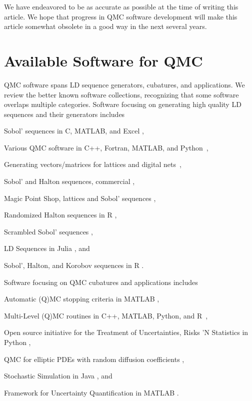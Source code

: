 \documentclass[graybox,footinfo]{svmult}
\begin{document}
We have endeavored to be as accurate as possible at the time of writing this article.  We hope that progress in QMC software development will make this article somewhat obsolete in a good way in the next several years.

\section{Available Software for QMC} \label{sec:available} 
QMC software spans  LD sequence generators, cubatures, and applications.  We review the better known software collections, recognizing that some software overlaps multiple categories.
Software focusing on generating high quality LD sequences  and their generators includes
\begin{description}[format=\textup,format=\textbf]
	\item[BRODA] Sobol' sequences in C, MATLAB, and Excel \cite{BRODA20a},
	\item[Burkhardt] Various QMC software in C++, Fortran, MATLAB, and Python~\cite{Bur20a},
	\item[LatNet Builder] Generating vectors/matrices for lattices and digital nets~\cite{LEcEtal22a,LatNet},
	\item[MATLAB] Sobol' and Halton sequences, commercial \cite{MAT9.9},
	\item[MPS] Magic Point Shop, lattices and Sobol' sequences \cite{Nuy17a},
	\item[Owen] Randomized Halton sequences in R \cite{Owe20a},
	\item[PyTorch] Scrambled Sobol' sequences \cite{PyTorch},
	\item[QMC.jl] LD Sequences in Julia \cite{Rob20a}, and
	\item [qrng]  Sobol', Halton, and Korobov sequences in R \cite{QRNG2020}.
\end{description}
Software focusing on QMC cubatures and applications includes
\begin{description}[format=\textup,format=\textbf]
	\item[GAIL] Automatic (Q)MC stopping criteria in MATLAB \cite{ChoEtal20a},
	\item[ML(Q)MC] Multi-Level (Q)MC routines in C++, MATLAB, Python, and R~\cite{GilesSoft},
	\item[OpenTURNS] Open source initiative for the Treatment of Uncertainties, Risks 'N Statistics in Python \cite{OpenTURNS},
	\item[QMC4PDE] QMC for elliptic PDEs with random diffusion coefficients \cite{KuoNuy16a},
	\item[SSJ] Stochastic Simulation in Java \cite{SSJ}, and
	\item[UQLab] Framework for Uncertainty Quantification in MATLAB \cite{UQLab2014}.
\end{description}
\end{document}
